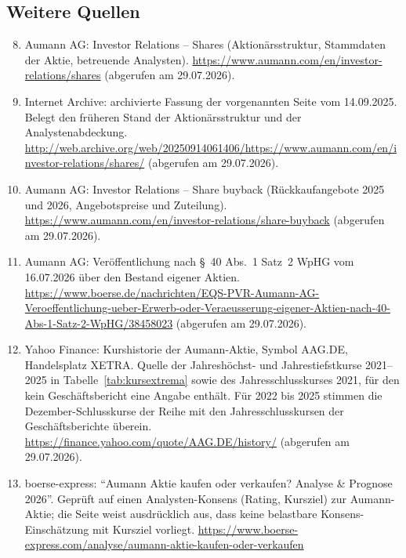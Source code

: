 \subsection*{Weitere Quellen}

\begin{enumerate}
\setcounter{enumi}{7}
\item\label{quelle:shares} Aumann AG: Investor Relations -- Shares (Aktion\"arsstruktur,
      Stammdaten der Aktie, betreuende Analysten).
      \url{https://www.aumann.com/en/investor-relations/shares}
      (abgerufen am 29.07.2026).
\item\label{quelle:archiv} Internet Archive: archivierte Fassung der vorgenannten Seite vom
      14.09.2025. Belegt den fr\"uheren Stand der Aktion\"arsstruktur und der
      Analystenabdeckung.
      \url{http://web.archive.org/web/20250914061406/https://www.aumann.com/en/investor-relations/shares/}
      (abgerufen am 29.07.2026).
\item\label{quelle:rueckkauf} Aumann AG: Investor Relations -- Share buyback (R\"uckkaufangebote 2025
      und 2026, Angebotspreise und Zuteilung).
      \url{https://www.aumann.com/en/investor-relations/share-buyback}
      (abgerufen am 29.07.2026).
\item\label{quelle:wphg} Aumann AG: Ver\"offentlichung nach \S~40 Abs.~1 Satz~2 WpHG vom
      16.07.2026 \"uber den Bestand eigener Aktien.
      \url{https://www.boerse.de/nachrichten/EQS-PVR-Aumann-AG-Veroeffentlichung-ueber-Erwerb-oder-Veraeusserung-eigener-Aktien-nach-40-Abs-1-Satz-2-WpHG/38458023}
      (abgerufen am 29.07.2026).
\item\label{quelle:yahoo} Yahoo Finance: Kurshistorie der Aumann-Aktie, Symbol AAG.DE,
      Handelsplatz XETRA. Quelle der Jahresh\"ochst- und Jahrestiefstkurse
      2021--2025 in Tabelle~\ref{tab:kursextrema} sowie des
      Jahresschlusskurses 2021, f\"ur den kein Gesch\"aftsbericht eine Angabe
      enth\"alt. F\"ur 2022 bis 2025 stimmen die Dezember-Schlusskurse der
      Reihe mit den Jahresschlusskursen der Gesch\"aftsberichte \"uberein.
      \url{https://finance.yahoo.com/quote/AAG.DE/history/}
      (abgerufen am 29.07.2026).
\item\label{quelle:boerse-express} boerse-express: \enquote{Aumann Aktie kaufen oder verkaufen? Analyse
      \& Prognose 2026}. Gepr\"uft auf einen Analysten-Konsens (Rating,
      Kursziel) zur Aumann-Aktie; die Seite weist ausdr\"ucklich aus, dass
      keine belastbare Konsens-Einsch\"atzung mit Kursziel vorliegt.
      \url{https://www.boerse-express.com/analyse/aumann-aktie-kaufen-oder-verkaufen}

\end{enumerate}
